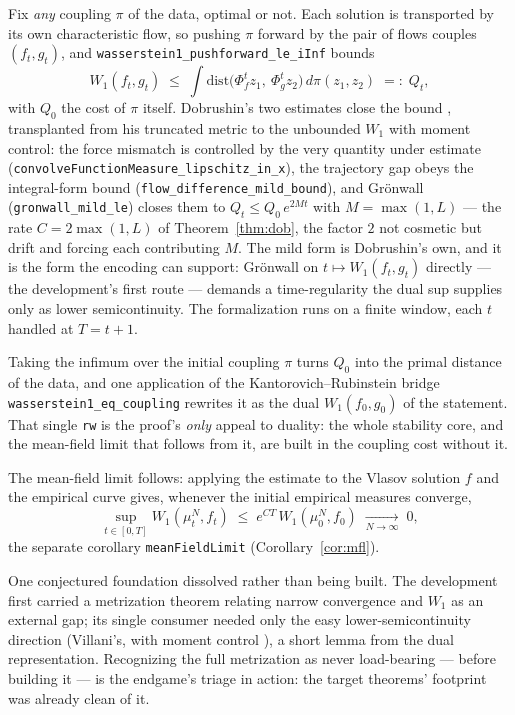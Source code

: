 \documentclass[11pt]{article}
\theoremstyle{plain}
\theoremstyle{definition}
\theoremstyle{remark}
\newcommand{\Wone}{W_1}
\newcommand{\lean}[1]{\texttt{#1}}
\begin{document}
Fix \emph{any} coupling $\pi$ of the data, optimal or not. Each solution is
transported by its own characteristic flow, so pushing $\pi$ forward by the pair of
flows couples $(f_t,g_t)$, and \lean{wasserstein1\_pushforward\_le\_iInf} bounds
\[
  \Wone(f_t,g_t)\;\le\;\int \mathrm{dist}\!\big(\Phi^t_f z_1,\ \Phi^t_g z_2\big)\,
  d\pi(z_1,z_2)\;=:\;Q_t ,
\]
with $Q_0$ the cost of $\pi$ itself. Dobrushin's two estimates close the bound
\cite{Dobrushin}, transplanted from his truncated metric to the unbounded $\Wone$
with moment control: the force mismatch is controlled by the very quantity under
estimate (\lean{convolveFunctionMeasure\_lipschitz\_in\_x}), the trajectory gap obeys
the integral-form bound (\lean{flow\_difference\_mild\_bound}), and Grönwall
(\lean{gronwall\_mild\_le}) closes them to $Q_t\le Q_0\,e^{2Mt}$ with $M=\max(1,L)$
--- the rate $C=2\max(1,L)$ of Theorem~\ref{thm:dob}, the factor $2$ not cosmetic but
drift and forcing each contributing $M$. The mild form is Dobrushin's own, and it is
the form the encoding can support: Grönwall on $t\mapsto\Wone(f_t,g_t)$ directly ---
the development's first route --- demands a time-regularity the dual sup supplies
only as lower semicontinuity. The formalization runs on a finite window, each $t$
handled at $T=t+1$.

Taking the infimum over the initial coupling $\pi$ turns $Q_0$ into the primal
distance of the data, and one application of the Kantorovich--Rubinstein bridge
\lean{wasserstein1\_eq\_coupling} rewrites it as the dual $\Wone(f_0,g_0)$ of the
statement. That single \lean{rw} is the proof's \emph{only} appeal to duality: the whole
stability core, and the mean-field limit that follows from it, are built in the coupling
cost without it.

The mean-field limit follows: applying the estimate to
the Vlasov solution $f$ and the empirical curve gives, whenever the initial empirical
measures converge,
\[
  \sup_{t\in[0,T]} \Wone(\mu^N_t, f_t) \;\le\; e^{CT}\,\Wone(\mu^N_0,f_0)
  \;\xrightarrow[N\to\infty]{}\; 0,
\]
the separate corollary \lean{meanFieldLimit} (Corollary~\ref{cor:mfl}).

One conjectured foundation dissolved rather than being built. The development first carried a
metrization theorem relating narrow convergence and $\Wone$ as an external gap; its single
consumer needed only the easy lower-semicontinuity direction (Villani's, with moment control
\cite{Villani}), a short lemma from the dual representation. Recognizing the full metrization
as never load-bearing --- before building it --- is the endgame's triage in action: the
target theorems' footprint was already clean of it.
\end{document}

